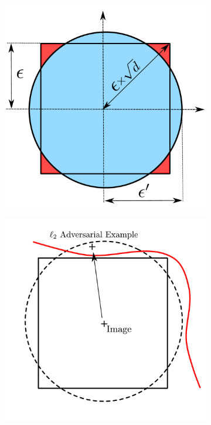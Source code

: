 \begin{figure}
   \centering
   \begin{subfigure}[b]{0.32\textwidth}
       \centering
       \includegraphics[scale=0.22]{figures/appendix3/ball_inclusion_adversarial_training.pdf}
       \caption{}
       \label{figure:ap3-ball_inclusion_adversarial_training}
   \end{subfigure}
   \hfill
   \begin{subfigure}[b]{0.32\textwidth}
       \centering
       \includegraphics[scale=0.22]{figures/appendix3/ball_adversarial_l2.pdf}

\end{subfigure}
\end{figure}
